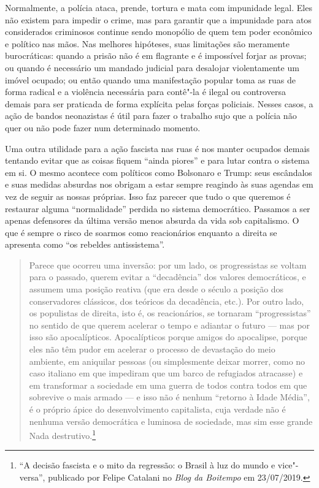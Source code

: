 Normalmente, a polícia ataca, prende, tortura e mata com impunidade legal. Eles não existem para impedir o crime, mas para garantir que a impunidade para atos considerados criminosos continue sendo monopólio de quem tem poder econômico e político nas mãos. Nas melhores hipóteses, suas limitações são meramente burocráticas: quando a prisão não é em flagrante e é impossível forjar as provas; ou quando é necessário um mandado judicial para desalojar violentamente um imóvel ocupado; ou então quando uma manifestação popular toma as ruas de forma radical e a violência necessária para contê"-la é ilegal ou controversa demais para ser praticada de forma explícita pelas forças policiais. Nesses casos, a ação de bandos neonazistas é útil para fazer o trabalho sujo que a polícia não quer ou não pode fazer num determinado momento.

Uma outra utilidade para a ação fascista nas ruas é nos manter ocupados demais tentando evitar que as coisas fiquem ``ainda piores'' e para lutar contra o sistema em si. O mesmo acontece com políticos como Bolsonaro e Trump: seus escândalos e suas medidas absurdas nos obrigam a estar sempre reagindo às suas agendas em vez de seguir as nossas próprias. Isso faz parecer que tudo o que queremos é restaurar alguma ``normalidade'' perdida no sistema democrático. Passamos a ser apenas defensores da última versão menos absurda da vida sob capitalismo. O que é sempre o risco de soarmos como reacionários enquanto a direita se apresenta como ``os rebeldes antissistema''.

\begin{quote}
Parece que ocorreu uma inversão: por um lado, os progressistas se voltam para o passado, querem evitar a ``decadência'' dos valores democráticos, e assumem uma posição reativa (que era desde o século  a posição dos conservadores clássicos, dos teóricos da decadência, etc.). Por outro lado, os populistas de direita, isto é, os reacionários, se tornaram ``progressistas'' no sentido de que querem acelerar o tempo e adiantar o futuro --- mas por isso são apocalípticos. Apocalípticos porque amigos do apocalipse, porque eles não têm pudor em acelerar o processo de devastação do meio ambiente, em aniquilar pessoas (ou simplesmente deixar morrer, como no caso italiano em que impediram que um barco de refugiados atracasse) e em transformar a sociedade em uma guerra de todos contra todos em que sobrevive o mais armado --- e isso não é nenhum ``retorno à Idade Média'', é o próprio ápice do desenvolvimento capitalista, cuja verdade não é nenhuma versão democrática e luminosa de sociedade, mas sim esse grande Nada destrutivo.\footnote{``A decisão fascista e o mito da regressão: o Brasil à luz do mundo e vice"-versa'', publicado por Felipe Catalani no \emph{Blog da Boitempo} em 23/07/2019.}
\end{quote}

